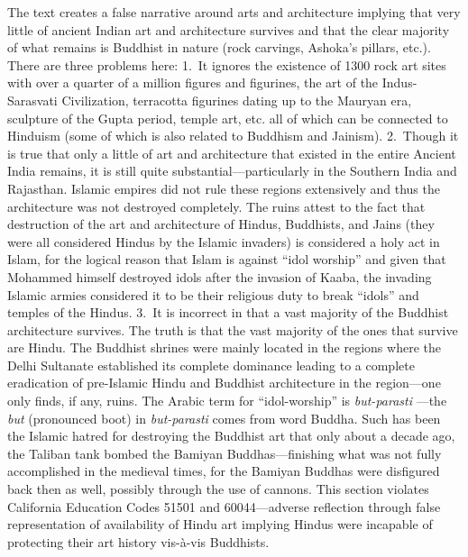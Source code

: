 The text creates a false narrative around arts and architecture implying that very little of ancient Indian art and architecture survives and that the clear majority of what remains is Buddhist in nature (rock carvings, Ashoka’s pillars, etc.). There are three problems here: 1.\ It ignores the existence of 1300 rock art sites with over a quarter of a million figures and figurines, the art of the Indus-Sarasvati Civilization, terracotta figurines dating up to the Mauryan era, sculpture of the Gupta period, temple art, etc. all of which can be connected to Hinduism (some of which is also related to Buddhism and Jainism). 2.\ Though it is true that only a little of art and architecture that existed in the entire Ancient India remains, it is still quite substantial—particularly in the Southern India and Rajasthan. Islamic empires did not rule these regions extensively and thus the architecture was not destroyed completely. The ruins attest to the fact that destruction of the art and architecture of Hindus, Buddhists, and Jains (they were all considered Hindus by the Islamic invaders) is considered a holy act in Islam, for the logical reason that Islam is against “idol worship” and given that Mohammed himself destroyed idols after the invasion of Kaaba, the invading Islamic armies considered it to be their religious duty to break “idols” and temples of the Hindus. 3.\ It is incorrect in that a vast majority of the Buddhist architecture survives. The truth is that the vast majority of the ones that survive are Hindu. The Buddhist shrines were mainly located in the regions where the Delhi Sultanate established its complete dominance leading to a complete eradication of pre-Islamic Hindu and Buddhist architecture in the region—one only finds, if any, ruins. The Arabic term for “idol-worship” is \textit{but-parasti} —the \textit{but}  (pronounced boot) in \textit{but-parasti}  comes from word Buddha. Such has been the Islamic hatred for destroying the Buddhist art that only about a decade ago, the Taliban tank bombed the Bamiyan Buddhas—finishing what was not fully accomplished in the medieval times, for the Bamiyan Buddhas were disfigured back then as well, possibly through the use of cannons. This section violates California Education Codes 51501 and 60044—adverse reflection through false representation of availability of Hindu art implying Hindus were incapable of protecting their art history vis-à-vis Buddhists.


